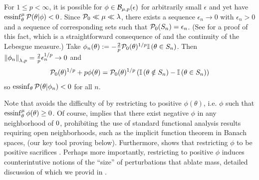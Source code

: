 \begin{ex}
%
For $1 \le p < \infty$, it is possible for $\phi \in
\mathcal{B}_{\mu,p}(\epsilon)$ for arbitrarily small $\epsilon$ and yet have
$\operatorname*{\mathrm{essinf}}^\mu_{\theta} \mathcal{P}(\theta \vert \phi) < 0$.
%
Since $\mathcal{P}_{0} \ll \mu \ll \lambda$, there exists a
sequence $\epsilon_n \rightarrow 0$ with $\epsilon_n > 0$ and a sequence of
corresponding sets such that $\mathcal{P}_{0}(S_n) = \epsilon_n$. (See
 for a proof of this fact, which is a
straightforward consequence of \citet[Proposition 15.5]{nielsen:1997:measure}
and the continuity of the Lebesgue measure.)  Take
%
%
$\phi_n(\theta) := - \frac{2}{p} \mathcal{P}_{0}(\theta)^{1/p} \mathbb{I}\left(\theta \in S_n\right)$.
%
%
Then $\left\Vert\phi_n\right\Vert_{\lambda, p} = \frac{2}{p} \epsilon_n^{1/p} \rightarrow 0$
and
%
\begin{align*}
%
\pbase(\theta)^{1/p} + p \phi(\theta) ={}
\pbase(\theta)^{1/p}
\left(\ind{\theta \notin S_n} - \ind{\theta \in S_n} \right)
%
\end{align*}
%
so $\operatorname*{\mathrm{essinf}}_\theta \mathcal{P}(\theta \vert \phi_n) < 0$ for all $n$.
%
\end{ex}


Note that \citep{gustafson:1996:local} avoids the difficulty of
 by restricting to positive $\phi(\theta)$, i.e. $\phi$ such
that $\operatorname*{\mathrm{essinf}}_\theta^\mu \phi(\theta) \ge 0$.  Of course, 
implies that there exist negative $\phi$ in any neighborhood of $0$,
prohibiting the use of standard functional analysis results requiring open
neighborhoods, such as the implicit function theorem in Banach spaces, (our key
tool proving  below). Furthermore,  shows that restricting $\phi$ to be positive
sacrifices  .  Perhaps more
importantly, restricting to positive $\phi$ induces counterintutive notions of
the ``size'' of perturbations that ablate mass, detailed discussion of which we
provid in .


